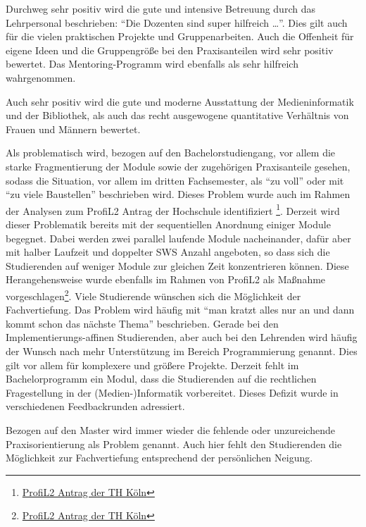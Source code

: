 Durchweg sehr positiv wird die gute und intensive Betreuung durch das
Lehrpersonal beschrieben: ``Die Dozenten sind super hilfreich
\ldots{}''. Dies gilt auch für die vielen praktischen Projekte und
Gruppenarbeiten. Auch die Offenheit für eigene Ideen und die
Gruppengröße bei den Praxisanteilen wird sehr positiv bewertet. Das
Mentoring-Programm wird ebenfalls als sehr hilfreich wahrgenommen.

Auch sehr positiv wird die gute und moderne Ausstattung der
Medieninformatik und der Bibliothek, als auch das recht ausgewogene
quantitative Verhältnis von Frauen und Männern bewertet.

Als problematisch wird, bezogen auf den Bachelorstudiengang, vor allem
die starke Fragmentierung der Module sowie der zugehörigen Praxisanteile
gesehen, sodass die Situation, vor allem im dritten Fachsemester, als
``zu voll'' oder mit ``zu viele Baustellen'' beschrieben wird. Dieses
Problem wurde auch im Rahmen der Analysen zum ProfiL2 Antrag der
Hochschule identifiziert \footnote{\href{https://www.th-koeln.de/mam/downloads/deutsch/hochschule/profil/lehre/profil2_antrag_ministerium.pdf}{ProfiL2
  Antrag der TH Köln}}. Derzeit wird dieser Problematik bereits mit der
sequentiellen Anordnung einiger Module begegnet. Dabei werden zwei
parallel laufende Module nacheinander, dafür aber mit halber Laufzeit
und doppelter SWS Anzahl angeboten, so dass sich die Studierenden auf
weniger Module zur gleichen Zeit konzentrieren können. Diese
Herangehensweise wurde ebenfalls im Rahmen von ProfiL2 als Maßnahme
vorgeschlagen\footnote{\href{https://www.th-koeln.de/mam/downloads/deutsch/hochschule/profil/lehre/profil2_antrag_ministerium.pdf}{ProfiL2
  Antrag der TH Köln}}. Viele Studierende wünschen sich die Möglichkeit
der Fachvertiefung. Das Problem wird häufig mit ``man kratzt alles nur
an und dann kommt schon das nächste Thema'' beschrieben. Gerade bei den
Implementierungs-affinen Studierenden, aber auch bei den Lehrenden wird
häufig der Wunsch nach mehr Unterstützung im Bereich Programmierung
genannt. Dies gilt vor allem für komplexere und größere Projekte.
Derzeit fehlt im Bachelorprogramm ein Modul, dass die Studierenden auf
die rechtlichen Fragestellung in der (Medien-)Informatik vorbereitet.
Dieses Defizit wurde in verschiedenen Feedbackrunden adressiert.

Bezogen auf den Master wird immer wieder die fehlende oder unzureichende
Praxisorientierung als Problem genannt. Auch hier fehlt den Studierenden
die Möglichkeit zur Fachvertiefung entsprechend der persönlichen
Neigung.

